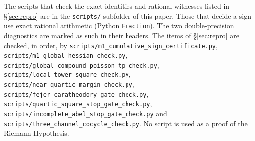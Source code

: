 \documentclass[11pt]{amsart}
\theoremstyle{definition}
\theoremstyle{remark}
\theoremstyle{definition}
\begin{document}
The scripts that check the exact identities and rational witnesses listed in \S\ref{sec:repro}
are in the \texttt{scripts/} subfolder of this paper. Those that decide a sign use exact rational
arithmetic (Python \texttt{Fraction}). The two double-precision diagnostics are marked as such in
their headers. The items of \S\ref{sec:repro} are checked, in order, by \texttt{scripts/\allowbreak m1\_\allowbreak cumulative\_\allowbreak sign\_\allowbreak certificate.py}, \texttt{scripts/\allowbreak m1\_\allowbreak global\_\allowbreak hessian\_\allowbreak check.py}, \texttt{scripts/\allowbreak global\_\allowbreak compound\_\allowbreak poisson\_\allowbreak tp\_\allowbreak check.py}, \texttt{scripts/\allowbreak local\_\allowbreak tower\_\allowbreak square\_\allowbreak check.py}, \texttt{scripts/\allowbreak near\_\allowbreak quartic\_\allowbreak margin\_\allowbreak check.py}, \texttt{scripts/\allowbreak fejer\_\allowbreak caratheodory\_\allowbreak gate\_\allowbreak check.py}, \texttt{scripts/\allowbreak quartic\_\allowbreak square\_\allowbreak stop\_\allowbreak gate\_\allowbreak check.py}, \texttt{scripts/\allowbreak incomplete\_\allowbreak abel\_\allowbreak stop\_\allowbreak gate\_\allowbreak check.py} and \texttt{scripts/\allowbreak three\_\allowbreak channel\_\allowbreak cocycle\_\allowbreak check.py}. No script is used as a proof of the Riemann Hypothesis.
\end{document}
